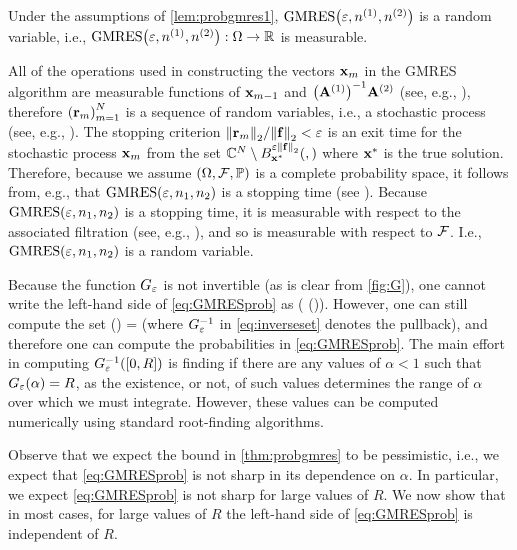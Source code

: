\label{lem:randomvariable}
Under the assumptions of \cref{lem:probgmres1}, $\GMRES{\eps}{\nso}{\nst}$ is a random variable, i.e., $\GMRES{\eps}{\nso}{\nst}:\Omega\rightarrow \RR$ is measurable.
\ele

All of the operations used in constructing the vectors $\mathbf{x}_{m}$ in the GMRES algorithm are measurable functions of $\mathbf{x}_{m-1}$ and $\AmatoI\Amatt$ (see, e.g., \cite[Algorithms 11.4.2 and 5.1.3]{GoVa:13}), therefore $\mleft(\brm\mright)_{m=1}^N$ is a sequence of random variables, i.e., a stochastic process (see, e.g., \cite[Definition 2.1.4]{Ok:13}). The stopping criterion $\Nt{\brm}/\Nt{\bff} < \eps$ is an exit time for the stochastic process $\mathbf{x}_{m}$ from the set $\CCN \setminus \ball{\eps\Nt{\bff}}{\bxs},$ where $\mathbf{x}^{*}$ is the true solution. Therefore, because we assume $\OFP$ is a complete probability space, it follows from, e.g.,  \cite[Example 7.2.2]{Ok:13} that $\GMRES{\eps}{\no}{\nt}$ is a stopping time (see \cite[Definition 7.2.1]{Ok:13}). Because $\GMRES{\eps}{\no}{\nt}$ is a stopping time, it is measurable with respect to the associated filtration (see, e.g., \cite[Definition 3.2.2]{Ok:13}), and so is measurable with respect to $\mathcal F$. I.e., $\GMRES{\eps}{\no}{\nt}$ is a random variable.
\epf

\label{rem:computable}
Because the function $G_{\varepsilon}$ is not invertible (as is clear from \cref{fig:G}), one cannot write the left-hand side of \cref{eq:GMRESprob} as
\beqs
\PP\mleft(\NLiDRRR{\nso-\nst} \leq \GfnnameI\mleft(\mleft[0,R\mright]\mright)\mright).
\eeqs
However, one can still compute the set
\beq\label{eq:inverseset}
\GfnnameI\mleft(\mleft[0,R\mright]\mright) = \set{\alpha \st \Gfn{\alpha} \in \mleft[0,R\mright]}
\eeq
(where $G_{\varepsilon}^{-1}$ in \cref{eq:inverseset} denotes the pullback), and therefore one can compute the probabilities in \cref{eq:GMRESprob}. The main effort in computing $\GfnI{\mleft[0,R\mright]}$ is finding if there are any values of $\alpha < 1$ such that $\Gfn{\alpha} = R$, as the existence, or not, of such values determines the range of $\alpha$ over which we must integrate. However, these values can be computed numerically using standard root-finding algorithms.
\ere

\label{rem:pessimistic}
Observe that we expect the bound in \cref{thm:probgmres} to be pessimistic, i.e., we expect that \cref{eq:GMRESprob} is not sharp in its dependence on $\alpha$. In particular, we expect \cref{eq:GMRESprob} is not sharp for large values of $R.$ We now show that in most cases, for large values of $R$ the left-hand side of \cref{eq:GMRESprob} is independent of $R$.

